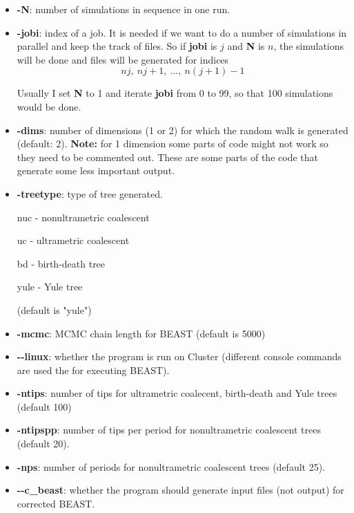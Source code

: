 \begin{itemize}
\item \textbf{-N}: number of simulations in sequence in one run.
\item \textbf{-jobi}: index of a job. It is needed if we want to do a number of simulations in parallel and keep the track of files. So if \textbf{jobi} is $j$ and \textbf{N} is $n$, the simulations will be done and files will be generated for indices
$$nj, \ nj+1, \ ... , \ n(j+1) - 1$$ 

Usually I set \textbf{N} to 1 and iterate \textbf{jobi} from 0 to 99, so that 100 simulations would be done.


\item \textbf{-dims}: number of dimensions (1 or 2) for which the random walk is generated (default: 2). \textbf{Note:} for 1 dimension some parts of code might not work so they need to be commented out. These are some parts of the code that generate some less important output.

\item \textbf{-treetype}: type of tree generated.

nuc - nonultrametric coalescent

uc - ultrametric coalescent

bd - birth-death tree

yule - Yule tree

(default is "yule")
\item \textbf{-mcmc}: MCMC chain length for BEAST (default is 5000)

\item \textbf{-{}-linux}: whether the program is run on Cluster (different console commands are used the for executing BEAST).

\item \textbf{-ntips}: number of tips for ultrametric coalecent, birth-death and Yule trees (default 100)

\item \textbf{-ntipspp}: number of tips per period for nonultrametric coalescent trees (default 20).

\item \textbf{-nps}: number of periods for nonultrametric coalescent trees (default 25).

\item \textbf{-{}-c\_beast}: whether the program should generate input files (not output) for corrected BEAST.


\end{itemize}

